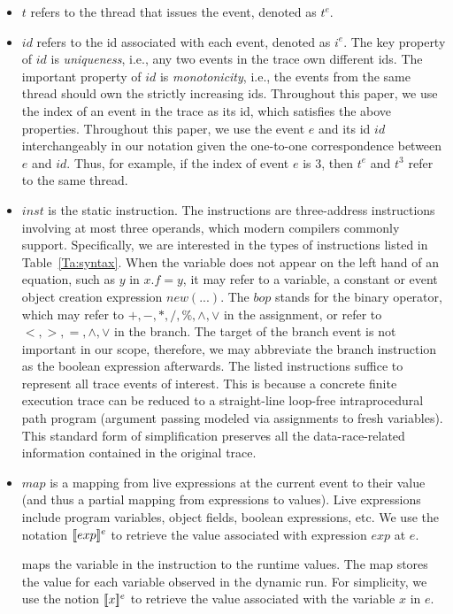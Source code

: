 \begin{itemize}
\item $t$ refers to the thread that issues the event, denoted as $t^e$.
\item  $id$ refers to the id associated with each event, denoted as $i^e$. The key property of  $id$ is {\em uniqueness}, i.e., any two events in the trace own different ids. The important property of $id$ is {\em monotonicity}, i.e.,  the events from the same thread should own the strictly increasing ids. Throughout this paper, we use  the index of an event in the trace as its id, which satisfies the above properties. Throughout this paper, we use the event $e$ and its id $id$ interchangeably in our notation given the one-to-one correspondence between $e$ and $id$. Thus, for example, if the index of event $e$ is 3, then $t^e$ and $t^3$ refer to the same thread.
\item $inst$ is the static instruction. The instructions are three-address instructions involving at most three operands, which modern compilers commonly support.  Specifically, we are interested in the types of instructions listed in Table~\ref{Ta:syntax}. When the variable does not appear on the left hand of an equation, such as $y$ in $x.f=y$, it may refer to a variable, a constant or event object creation expression $new (...)$.  The $bop$ stands for the binary operator, which may refer to $+, -, *, /, \%, \wedge, \vee$ in the assignment, or refer to $<, >, =, \wedge, \vee$ in the branch. The target of the branch event is not important in our scope, therefore, we may abbreviate the branch instruction as the boolean expression afterwards. The listed instructions suffice to represent all trace events of interest. This is because a concrete finite execution trace can be reduced to a straight-line loop-free intraprocedural path program (argument passing modeled via assignments to fresh variables). This standard form of simplification preserves all the data-race-related information contained in the original trace. 
\item $map$ is a mapping from live expressions at the current event to their value (and thus a partial mapping from expressions to values). Live expressions include program variables, object fields, boolean expressions, etc. We use the notation $\lbrack\!\lbrack exp \rbrack\!\rbrack^e$ to retrieve the value associated with expression $exp$ at $e$.

maps the variable in the instruction to the runtime values. The map stores the value for each variable observed in the dynamic run. For simplicity, we use the notion $\lbrack\!\lbrack x \rbrack\!\rbrack^e$ to retrieve the value associated with the variable $x$ in $e$. 
\end{itemize}

